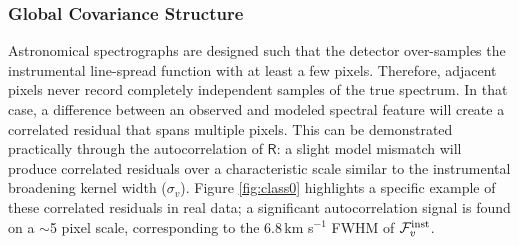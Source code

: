 \documentclass[iop,floatfix]{emulateapj}
\newcommand{\vR}{\mathsf{R}}
\begin{document}
\subsubsection{Global Covariance Structure} \label{subsec:global_covariance}

Astronomical spectrographs are designed such that the detector over-samples the instrumental 
line-spread function with at least a few pixels.  Therefore, adjacent pixels never record 
completely independent samples of the true spectrum.  In that case, a difference between an 
observed and modeled spectral feature will create a correlated residual that spans multiple 
pixels.  This can be demonstrated practically through the autocorrelation of $\vR$: a slight model 
mismatch will produce correlated residuals over a characteristic scale similar to the instrumental
broadening kernel width ($\sigma_v$).  Figure \ref{fig:class0} highlights a specific example of 
these correlated residuals in real data; a significant autocorrelation signal is found on a $\sim$5 
pixel scale, corresponding to the 6.8\,km s$^{-1}$ FWHM of $\mathcal{F}_v^{\rm inst}$.  
\end{document}
